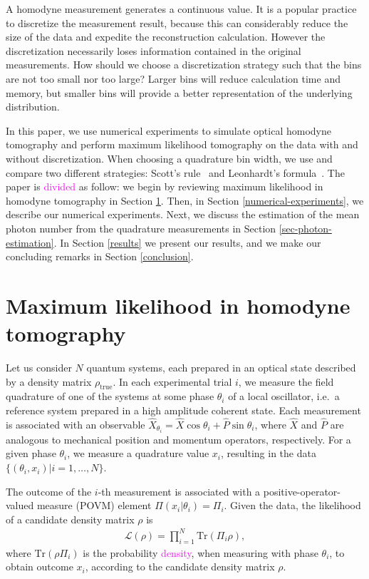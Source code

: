 \documentclass[
reprint,
superscriptaddress,
showpacs,
amsmath,
amssymb,
aps,
pra,
longbibliography
]{revtex4-1}
\providecommand{\editcolor}[2]{\textcolor{#1}{#2}}
\providecommand{\editcolor}[2]{#2}
\newcommand{\SG}[1]{\editcolor{magenta}{#1}}
\newcommand{\rhotrue}{\rho_{\text{true}}}
\begin{document}
A homodyne measurement generates a continuous value.  It is a
  popular practice to discretize the measurement result, because this
  can considerably reduce the size of the data and expedite the
  reconstruction calculation.  However the discretization necessarily
  loses information contained in the original measurements.
 How should we choose a discretization strategy such that the bins are not too small nor too large? Larger bins will reduce calculation time and memory, but
smaller bins will provide a better representation of the underlying distribution.
 
In this paper, we use numerical experiments to simulate optical
homodyne tomography and perform maximum likelihood tomography on the
data with and without discretization. When choosing a quadrature bin
width, we use and compare two different strategies: Scott's
rule~\cite{Scott2010} and Leonhardt's formula~\cite{Leonhardt1996}.
The paper is \SG{divided} as follow: we begin by reviewing maximum
likelihood in homodyne tomography in Section \ref{MLE}. Then, in
Section \ref{numerical-experiments}, we describe our numerical
experiments. Next, we discuss the estimation of the mean photon number
from the quadrature measurements in Section
\ref{sec-photon-estimation}. In Section \ref{results} we present our
results, and we make our concluding remarks in Section
\ref{conclusion}.

\section{Maximum likelihood in homodyne tomography}
\label{MLE}
Let us consider $N$ quantum systems, each prepared in an optical state
described by a density matrix $\rhotrue$. In each experimental trial
$i$, we measure the field quadrature of one of the systems at some
phase $\theta_i$ of a local oscillator, i.e.\ a reference system
prepared in a high amplitude coherent state.  Each measurement is
associated with an observable
$\hat{X}_{\theta_i} = \hat{X} \cos \theta_i + \hat{P} \sin \theta_i$,
where $\hat{X}$ and $\hat{P}$ are analogous to mechanical position and
momentum operators, respectively. For a given phase $\theta_i$, we
measure a quadrature value $x_i$, resulting in the data
$\{(\theta_i, x_i)| i = 1, \ldots, N\}$.

The outcome of the $i$-th measurement is associated with a
positive-operator-valued measure (POVM) element
$\Pi (x_i|\theta_i) = \Pi_i$. Given the data, the likelihood
of a candidate density matrix $\rho$ is
\begin{eqnarray}
  \mathcal{L} (\rho)= \prod_{i=1}^{N} \mathrm{Tr} (\Pi_i \rho),
  \label{eq-likelihood}
\end{eqnarray}
where $\mathrm{Tr}(\rho \Pi_i)$ is the probability \SG{density}, when
measuring with phase $\theta_i$, to obtain outcome $x_i$, according to
the candidate density matrix $\rho$.
\end{document}
